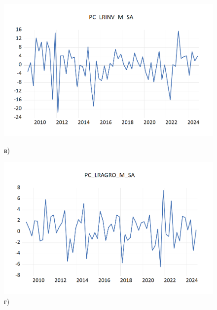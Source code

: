 \documentclass[a4paper, 14pt]{extreport}
\numberwithin{equation}{section}
\numberwithin{equation}{section}
\begin{document}
\begin{figure}[h!]
		\begin{minipage}{0.5\textwidth}
			\centering
			\includegraphics[scale=0.4]{images/image31}
			\caption*{в)}
		\end{minipage}%
		\hfill %
		\begin{minipage}{0.5\textwidth}
			\centering
			\includegraphics[scale=0.4]{images/image32}
			\caption*{г)}
		\end{minipage}%
		

\end{figure}
\end{document}
